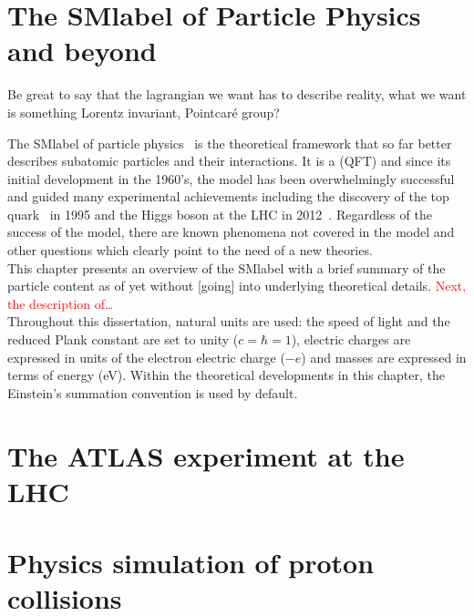\chapter{The \acrlong{SMlabel} of Particle Physics and beyond}

Be great to say that the lagrangian we want has to describe reality, what we want is something Lorentz invariant, Pointcaré group?

The \acrfull{SMlabel} of particle physics~\cite{PhysRevLett.19.1264,GLASHOW1961579,RevModPhys.52.525} is the theoretical framework
that so far better describes subatomic particles and their interactions.
It is a  (\acrshort{QFT}) and since its initial development in the 1960's,
the model has been overwhelmingly successful and guided many experimental achievements
including the discovery of the top quark~\cite{topsearch1995,PhysRevLett.74.2626} in 1995
and the Higgs boson at the LHC in 2012~\cite{ATLASHiggs2012,CMShiggs2012}.
Regardless of the success of the model, there are known phenomena not covered in the model
and other questions which clearly point to the need of a new theories.\\
This chapter presents an overview of the \acrshort{SMlabel} with a brief summary of the particle content as of yet without
[going] into underlying theoretical details. \textcolor{red}{Next, the description of\ldots}\\

Throughout this dissertation, natural units are used: the speed of light and the reduced Plank constant are set to unity ($c=\hbar=1$),
electric charges are expressed in units of the electron electric charge ($-e$) and masses are expressed in terms of energy (eV).
Within the theoretical developments in this chapter, the Einstein's summation convention is used by default. 



\chapter{The ATLAS experiment at the LHC}



\chapter{Physics simulation of proton collisions}



